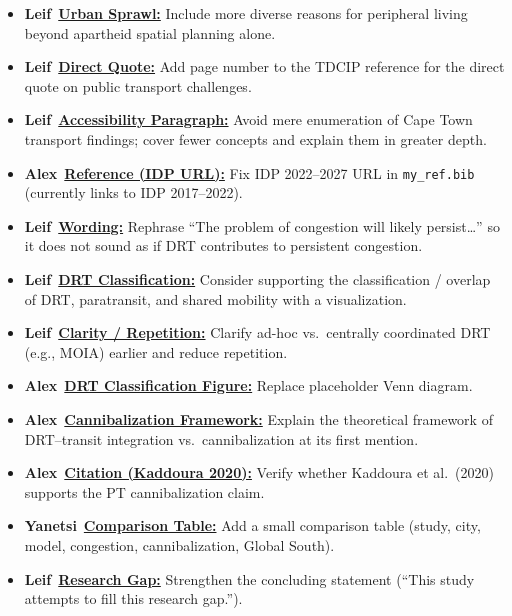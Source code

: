 \documentclass[preprint,12pt,authoryear]{elsarticle}
\newcommand{\todobadge}[2]{\colorbox{#1}{\textbf{\scriptsize #2}}}
\newcommand{\badgeLeif}{\todobadge{yellow!40}{Leif}}
\newcommand{\badgeAlex}{\todobadge{blue!25}{Alex}}
\newcommand{\badgeYanetsi}{\todobadge{purple!30}{Yanetsi}}
\begin{document}
\begin{itemize}
  \item[$\square$] \badgeLeif\ \hyperlink{todo:lit-sprawl}{\textbf{Urban Sprawl:}} Include more diverse reasons for peripheral living beyond apartheid spatial planning alone.
  \item[$\square$] \badgeLeif\ \hyperlink{todo:lit-quote-page}{\textbf{Direct Quote:}} Add page number to the TDCIP reference for the direct quote on public transport challenges.
  \item[$\square$] \badgeLeif\ \hyperlink{todo:lit-accessibility}{\textbf{Accessibility Paragraph:}} Avoid mere enumeration of Cape Town transport findings; cover fewer concepts and explain them in greater depth.
  \item[$\square$] \badgeAlex\ \hyperlink{todo:lit-cite-idp}{\textbf{Reference (IDP URL):}} Fix IDP 2022--2027 URL in \texttt{my\_ref.bib} (currently links to IDP 2017--2022).
  \item[$\square$] \badgeLeif\ \hyperlink{todo:lit-persist}{\textbf{Wording:}} Rephrase ``The problem of congestion will likely persist\dots'' so it does not sound as if DRT contributes to persistent congestion.
  \item[$\square$] \badgeLeif\ \hyperlink{todo:lit-viz}{\textbf{DRT Classification:}} Consider supporting the classification / overlap of DRT, paratransit, and shared mobility with a visualization.
  \item[$\square$] \badgeLeif\ \hyperlink{todo:lit-moia}{\textbf{Clarity / Repetition:}} Clarify ad-hoc vs.\ centrally coordinated DRT (e.g., MOIA) earlier and reduce repetition.
  \item[$\square$] \badgeAlex\ \hyperlink{todo:lit-replace-fig}{\textbf{DRT Classification Figure:}} Replace placeholder Venn diagram.
  \item[$\square$] \badgeAlex\ \hyperlink{todo:lit-cannib-framework}{\textbf{Cannibalization Framework:}} Explain the theoretical framework of DRT--transit integration vs.\ cannibalization at its first mention.
  \item[$\square$] \badgeAlex\ \hyperlink{todo:lit-cite-kaddoura}{\textbf{Citation (Kaddoura 2020):}} Verify whether Kaddoura et al.\ (2020) supports the PT cannibalization claim.
  \item[$\square$] \badgeYanetsi\ \hyperlink{todo:lit-yanetsi-table}{\textbf{Comparison Table:}} Add a small comparison table (study, city, model, congestion, cannibalization, Global South).
  \item[$\square$] \badgeLeif\ \hyperlink{todo:lit-gap-weak}{\textbf{Research Gap:}} Strengthen the concluding statement (``This study attempts to fill this research gap.'').

\end{itemize}
\end{document}
